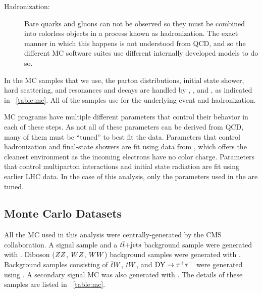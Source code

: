 \begin{description}
    \item[Hadronization:] Bare quarks and gluons can not be observed so they
        must be combined into colorless objects in a process known as
        hadronization. The exact manner in which this happens is not understood
        from QCD, and so the different MC software suites use different
        internally developed models to do so.


\end{description}

In the MC samples that we use, the parton distributions, initial state shower,
hard scattering, and resonances and decays are handled by \MADGRAPH
\cite{alwall2014}, \POWHEG \cite{nason2004}\cite{alioli2010}\cite{re2011},
and \PYTHIAsix \cite{sjostran2006}, as indicated in \TAB~\ref{table:mc}. All of the samples use
\PYTHIAsix for the underlying event and hadronization. 

MC programs have multiple different parameters that control their behavior in
each of these steps. As not all of these parameters can be derived from QCD,
many of them must be ``tuned'' to best fit the data. Parameters that control
hadronization and final-state showers are fit using data from \LEP, which
offers the cleanest environment as the incoming electrons have no color charge.
Parameters that control multiparton interactions and initial state radiation
are fit using earlier LHC data. In the case of this analysis, only the
parameters used in the \PYTHIAsix are tuned.

\subsection{Monte Carlo Datasets}
\label{ssec:monte_carlo}

All the MC used in this analysis were centrally-generated by the CMS
collaboration. A \DYtoll signal sample and a $t\overline{t}\text{+jets}$ background
sample were generated with \MADGRAPH. Diboson ($ZZ$, $WZ$, $WW$)
background samples were generated with \PYTHIAsix . Background samples
consisting of $\overline{t} W$, $t W$, and $\text{DY} \to \tau^{+} \tau^{-}$ were generated using
\POWHEG . A secondary signal MC was also generated with \POWHEG. The details of
these samples are listed in \TAB~\ref{table:mc}.

